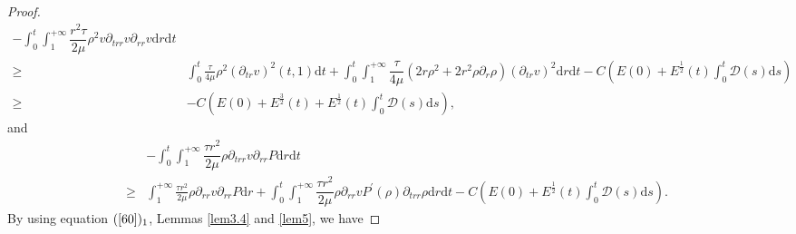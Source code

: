 \documentclass[10pt,reqno]{amsart}
\numberwithin{equation}{section}
\begin{document}
\begin{proof}
\begin{equation}
\begin{aligned}
				-\int_{0}^{t}\int_{1}^{+\infty}\dfrac{r^2\tau}{2\mu}\rho^2v\partial_{trr} v\partial_{rr} v\mathrm{d}r\mathrm{d}t\\
				\geq&\int_{0}^{t}\frac{\tau}{4\mu}\rho^2(\partial_{tr}v)^2(t,1)\mathrm{d}t
				+\int_{0}^{t}\int_{1}^{+\infty}\dfrac{\tau}{4\mu}(2r\rho^2+2r^2\rho\partial_{r}\rho)(\partial_{tr}v)^2\mathrm{d}r\mathrm{d}t
				-C\left(E(0)+ E^{\frac{1}{2}}(t) \int_{0}^{t}\mathcal{D}(s)\mathrm{d}s\right)\\
				\geq& -C\left(E(0)+ E^{\frac{3}{2}}(t)+ E^{\frac{1}{2}}(t) \int_{0}^{t}\mathcal{D}(s)\mathrm{d}s\right),
			\end{aligned}
		\end{equation}
		and 
		\begin{equation}\nonumber
			\begin{aligned}
				&-\int_{0}^{t}\int_{1}^{+\infty}\dfrac{\tau r^2}{2\mu}\rho\partial_{trr} v\partial_{rr} P\mathrm{d}r\mathrm{d}t\\
				\geq&\int_{1}^{+\infty}\frac{\tau r^2}{2\mu}\rho\partial_{rr} v\partial_{rr} P\mathrm{d}r +\int_{0}^{t}\int_{1}^{+\infty}\dfrac{\tau r^2}{2\mu}\rho\partial_{rr} v P^{\prime}(\rho)\partial_{trr} \rho \mathrm{d}r\mathrm{d}t
				-C\left(E(0)+ E^{\frac{1}{2}}(t) \int_{0}^{t}\mathcal{D}(s)\mathrm{d}s\right).
			\end{aligned}
		\end{equation}	
		By using equation $(\ref{60})_1$, Lemmas \ref{lem3.4} and \ref{lem5}, we have
	

\end{proof}
\end{document}
